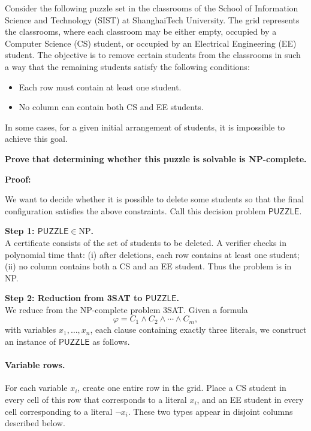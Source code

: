 \problem{}
Consider the following puzzle set in the classrooms of the School of Information Science and Technology (SIST) at ShanghaiTech University. The grid represents the classrooms, where each classroom may be either empty, occupied by a Computer Science (CS) student, or occupied by an Electrical Engineering (EE) student. The objective is to remove certain students from the classrooms in such a way that the remaining students satisfy the following conditions:

\begin{itemize}
    \item Each row must contain at least one student.
    \item No column can contain both CS and EE students.
\end{itemize}

In some cases, for a given initial arrangement of students, it is impossible to achieve this goal.

\textbf{Prove that determining whether this puzzle is solvable is NP-complete.}

\noindent \textbf{Proof:}

We want to decide whether it is possible to delete some students so that
the final configuration satisfies the above constraints. 
Call this decision problem \(\mathsf{PUZZLE} \).

\noindent\textbf{Step 1: \(\mathsf{PUZZLE} \in \mathrm{NP}\).} \\

A certificate consists of the set of students to be deleted.
A verifier checks in polynomial time that:
(i) after deletions, each row contains at least one student;
(ii) no column contains both a CS and an EE student.
Thus the problem is in NP.

\noindent\textbf{Step 2: Reduction from 3\textsc{SAT} to \(\mathsf{PUZZLE}\).} \\

We reduce from the NP-complete problem 3\textsc{SAT}.  
Given a formula
\[
\varphi = C_1 \land C_2 \land \cdots \land C_m ,
\]
with variables \(x_1,\dots,x_n\), each clause containing exactly three literals,
we construct an instance of \(\mathsf{PUZZLE}\) as follows.

\paragraph{Variable rows.}
For each variable \(x_i\), create one entire row in the grid.
Place a CS student in every cell of this row that corresponds to a literal \(x_i\),
and an EE student in every cell corresponding to a literal \(\neg x_i\).
These two types appear in disjoint columns described below.

